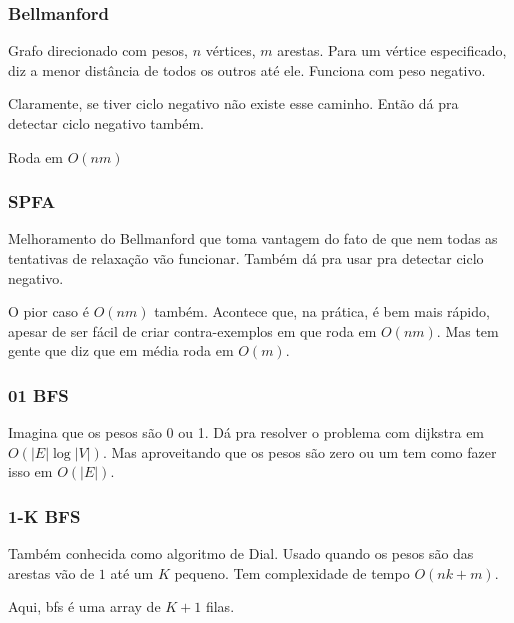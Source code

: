 \subsubsection{Bellmanford}

Grafo direcionado com pesos, $n$ vértices, $m$ arestas.
Para um vértice especificado, diz a menor distância de todos os
outros até ele. Funciona com peso negativo.

Claramente, se tiver ciclo negativo não existe esse caminho. Então
dá pra detectar ciclo negativo também.

Roda em $O(nm)$


\subsubsection{SPFA}

Melhoramento do Bellmanford que toma vantagem do fato de que nem todas
as tentativas de relaxação vão funcionar. Também dá pra usar pra detectar
ciclo negativo.

O pior caso é $O(nm)$ também. Acontece que, na prática, é bem mais rápido, apesar
de ser fácil de criar contra-exemplos em que roda em $O(nm)$. Mas tem gente que diz
que em média roda em $O(m)$.


\subsubsection{01 BFS}

Imagina que os pesos são 0 ou 1. Dá pra resolver o problema com dijkstra em
$O(|E| \log |V|)$. Mas aproveitando que os pesos são zero ou um tem como
fazer isso em $O(|E|)$.


\subsubsection{1-K BFS}

Também conhecida como algoritmo de Dial. Usado quando os pesos são das arestas
vão de $1$ até um $K$ pequeno. Tem complexidade de tempo $O(nk + m)$.

Aqui, bfs é uma array de $K+1$ filas.

